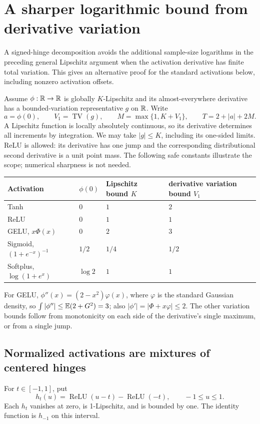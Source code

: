 \section{A sharper logarithmic bound from derivative variation}
\label{sec:bv-activations}
A signed-hinge decomposition avoids the additional sample-size logarithms in the preceding general Lipschitz argument when the activation derivative has finite total variation. This gives an alternative proof for the standard activations below, including nonzero activation offsets.

Assume $\phi:\mathbb R\to\mathbb R$ is globally $K$-Lipschitz and its almost-everywhere derivative has a bounded-variation representative $g$ on $\mathbb R$. Write
\[
 a=\phi(0),\qquad V_1=\operatorname{TV}(g),\qquad
 M=\max\{1,K+V_1\},\qquad T=2+|a|+2M.
\]
A Lipschitz function is locally absolutely continuous, so its derivative determines all increments by integration. We may take $|g|\le K$, including its one-sided limits. ReLU is allowed: its derivative has one jump and the corresponding distributional second derivative is a unit point mass. The following safe constants illustrate the scope; numerical sharpness is not needed.
\begin{center}
\begin{tabular}{llll}
\toprule
Activation & $\phi(0)$ & Lipschitz bound $K$ & derivative variation bound $V_1$ \\
\midrule
Tanh & $0$ & $1$ & $2$ \\
ReLU & $0$ & $1$ & $1$ \\
GELU, $x\Phi(x)$ & $0$ & $2$ & $3$ \\
Sigmoid, $(1+e^{-x})^{-1}$ & $1/2$ & $1/4$ & $1/2$ \\
Softplus, $\log(1+e^x)$ & $\log2$ & $1$ & $1$ \\
\bottomrule
\end{tabular}
\end{center}
For GELU, $\phi''(x)=(2-x^2)\varphi(x)$, where $\varphi$ is the standard Gaussian density, so $\int|\phi''|\le\mathbb E(2+G^2)=3$; also $|\phi'|=|\Phi+x\varphi|\le2$. The other variation bounds follow from monotonicity on each side of the derivative's single maximum, or from a single jump.

\subsection{Normalized activations are mixtures of centered hinges}
For $t\in[-1,1]$, put
\[
 h_t(u)=\operatorname{ReLU}(u-t)-\operatorname{ReLU}(-t),
 \qquad -1\le u\le1.
\]
Each $h_t$ vanishes at zero, is 1-Lipschitz, and is bounded by one. The identity function is $h_{-1}$ on this interval.


